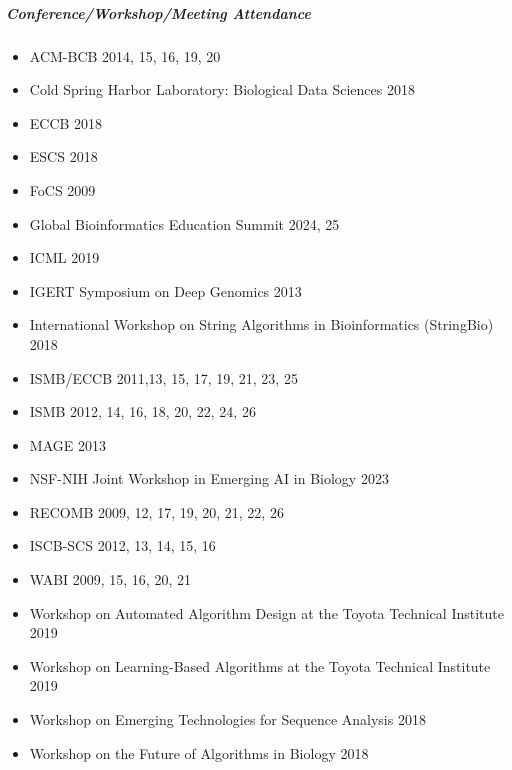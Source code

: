 \documentclass[10pt,letterpaper]{article}
\begin{document}
\subparagraph{Conference/Workshop/Meeting Attendance}
\begin{itemize}
	\item ACM-BCB 2014, 15, 16, 19, 20
	\item Cold Spring Harbor Laboratory: Biological Data Sciences 2018
	\item ECCB 2018
	\item ESCS 2018
	\item FoCS 2009
	\item Global Bioinformatics Education Summit 2024, 25 
	\item ICML 2019
	\item IGERT Symposium on Deep Genomics 2013
	\item International Workshop on String Algorithms in Bioinformatics (StringBio) 2018
	\item ISMB/ECCB 2011,13, 15, 17, 19, 21, 23, 25
	\item ISMB 2012, 14, 16, 18, 20, 22, 24, 26
	\item MAGE 2013
	\item NSF-NIH Joint Workshop in Emerging AI in Biology 2023
	\item RECOMB 2009, 12, 17, 19, 20, 21, 22, 26
	\item ISCB-SCS 2012, 13, 14, 15, 16
	\item WABI 2009, 15, 16, 20, 21
	\item Workshop on Automated Algorithm Design at the Toyota Technical Institute 2019
	\item Workshop on Learning-Based Algorithms at the Toyota Technical Institute 2019
	\item Workshop on Emerging Technologies for Sequence Analysis 2018
	\item Workshop on the Future of Algorithms in Biology 2018
\end{itemize}
\end{document}
